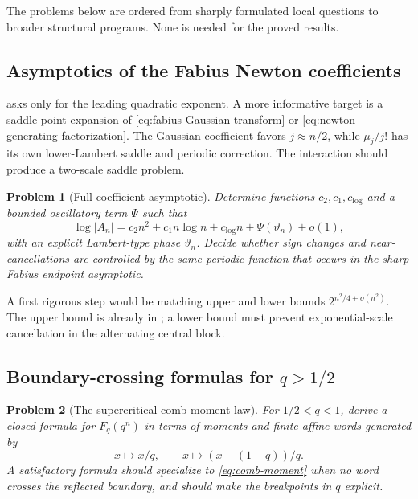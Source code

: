 \documentclass[11pt,a4paper,oneside]{article}
\newtheorem{problem}[problem]{Problem}
\theoremstyle{definition}
\theoremstyle{remark}
\begin{document}
The problems below are ordered from sharply formulated local questions to
broader structural programs.  None is needed for the proved results.

\subsection{Asymptotics of the Fabius Newton coefficients}

 asks only for the leading quadratic exponent.  A
more informative target is a saddle-point expansion of
\eqref{eq:fabius-Gaussian-transform} or
\eqref{eq:newton-generating-factorization}.  The Gaussian coefficient favors
$j\approx n/2$, while $\mu_j/j!$ has its own lower-Lambert saddle and periodic
correction.  The interaction should produce a two-scale saddle problem.

\begin{problem}[Full coefficient asymptotic]
\label{prob:full-A-asymptotic}
Determine functions $c_2,c_1,c_{\log}$ and a bounded oscillatory term
$\Psi$ such that
\begin{equation}
 \log|A_n|
 =c_2n^2+c_1n\log n+c_{\log}n
 +\Psi(\vartheta_n)+o(1),
 \label{eq:full-A-asymptotic}
\end{equation}
with an explicit Lambert-type phase $\vartheta_n$.  Decide whether sign
changes and near-cancellations are controlled by the same periodic function
that occurs in the sharp Fabius endpoint asymptotic.
\end{problem}

A first rigorous step would be matching upper and lower bounds
$2^{n^2/4+o(n^2)}$.  The upper bound is already in
; a lower bound must prevent exponential-scale
cancellation in the alternating central block.

\subsection{Boundary-crossing formulas for \texorpdfstring{$q>1/2$}{q greater than 1/2}}

\begin{problem}[The supercritical comb-moment law]
\label{prob:qgt-half}
For $1/2<q<1$, derive a closed formula for $F_q(q^n)$ in terms of moments and
finite affine words generated by
\[
 x\mapsto x/q,
 \qquad
 x\mapsto(x-(1-q))/q.
\]
A satisfactory formula should specialize to \eqref{eq:comb-moment} when no
word crosses the reflected boundary, and should make the breakpoints in $q$
explicit.
\end{problem}
\end{document}
